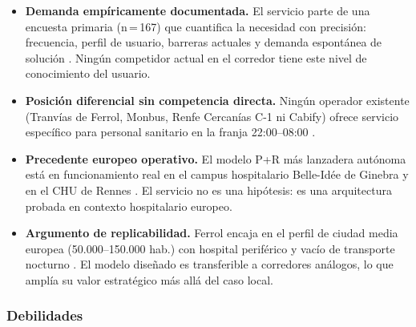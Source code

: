 \begin{itemize}

	\item \textbf{Demanda empíricamente documentada.} El servicio
	parte de una encuesta primaria (n\,=\,167) que cuantifica la
	necesidad con precisión: frecuencia, perfil de usuario, barreras
	actuales y demanda espontánea de solución
	\parencite{LouridoRegueira2026}. Ningún competidor actual en
	el corredor tiene este nivel de conocimiento del usuario.

	\item \textbf{Posición diferencial sin competencia directa.}
	Ningún operador existente (Tranvías de Ferrol, Monbus, Renfe
	Cercanías C-1 ni Cabify) ofrece servicio específico para
	personal sanitario en la franja 22:00--08:00
	\parencite{Alsaferrol2024horarios,RenfeCercaniasFerrol2026}.

	\item \textbf{Precedente europeo operativo.} El modelo P+R
	más lanzadera autónoma está en funcionamiento real en el
	campus hospitalario Belle-Idée de Ginebra y en el CHU de
	Rennes \parencite{AVENUE2023,SHOW2024Legacy}. El servicio no es
	una hipótesis: es una arquitectura probada en contexto
	hospitalario europeo.

	\item \textbf{Argumento de replicabilidad.} Ferrol encaja
	en el perfil de ciudad media europea (50.000--150.000 hab.)
	con hospital periférico y vacío de transporte nocturno
	\parencite{URBACTNight2024}. El modelo diseñado es
	transferible a corredores análogos, lo que amplía su
	valor estratégico más allá del caso local.

\end{itemize}

\subsubsection{Debilidades}
\label{sec:dafo-debilidades}

